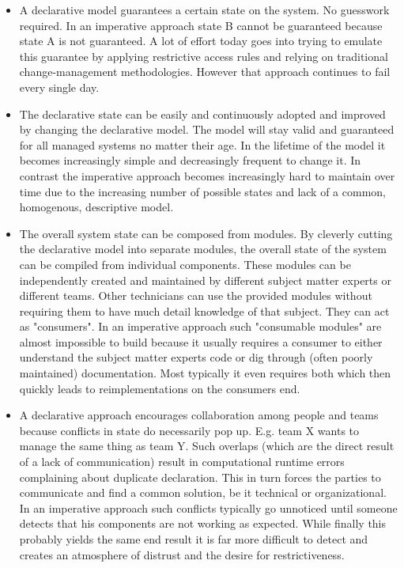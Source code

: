 \documentclass[12pt, a4paper]{article}
\begin{document}
\begin{itemize}
  \item A declarative model guarantees a certain state on the system. No guesswork required. In an imperative approach state B cannot be guaranteed because state A is not guaranteed. A lot of effort today goes into trying to emulate this guarantee by applying restrictive access rules and relying on traditional change-management methodologies. However that approach continues to fail every single day.

  \item The declarative state can be easily and continuously adopted and improved by changing the declarative model. The model will stay valid and guaranteed for all managed systems no matter their age. In the lifetime of the model it becomes increasingly simple and decreasingly frequent to change it. In contrast the imperative approach becomes increasingly hard to maintain over time due to the increasing number of possible states and lack of a common, homogenous, descriptive model.

  \item The overall system state can be composed from modules. By cleverly cutting the declarative model into separate modules, the overall state of the system can be compiled from individual components. These modules can be independently created and maintained by different subject matter experts or different teams. Other technicians can use the provided modules without requiring them to have much detail knowledge of that subject. They can act as "consumers". In an imperative approach such "consumable modules" are almost impossible to build because it usually requires a consumer to either understand the subject matter experts code or dig through (often poorly maintained) documentation. Most typically it even requires both which then quickly leads to reimplementations on the consumers end.

  \item A declarative approach encourages collaboration among people and teams because conflicts in state do necessarily pop up. E.g. team X wants to manage the same thing as team Y. Such overlaps (which are the direct result of a lack of communication) result in computational runtime errors complaining about duplicate declaration. This in turn forces the parties to communicate and find a  common solution, be it technical or organizational. In an imperative approach such conflicts typically go unnoticed until someone detects that his components are not working as expected. While finally this probably yields the same end result it is far more difficult to detect and creates an atmosphere of distrust and the desire for restrictiveness.


\end{itemize}
\end{document}

